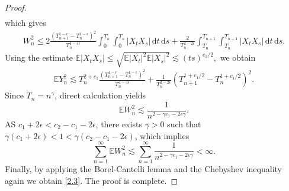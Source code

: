 \documentclass[10pt,a4paper]{amsart}
\begin{document}
\begin{proof}
\begin{align*}
	\end{align*} which gives \begin{align*}
		W_n^2 \le 2 \frac{(T_{n+1}^{1-\epsilon}-T_n^{1-\epsilon})^2}{T_n^{4-4\epsilon}} \int_0^{T_n}\int_0^{T_n} |X_t X_s|\,\mathrm{d}t\,\mathrm{d}s + \frac{2}{T_n^{2-2\epsilon}}\int_{T_n}^{T_{n+1}}\int_{T_n}^{T_{n+1}}|X_tX_s|\,\mathrm{d}t\,\mathrm{d}s.
	\end{align*}
	Using the estimate $
	\mathbb{E} |X_t X_s| \le \sqrt{\mathbb{E} |X_t|^2 \mathbb{E}|X_s|^2} \lesssim   (ts)^{c_1/2},
	$ we obtain \begin{align*}
		\mathbb{E} Y_n^2 \lesssim  T_n^{2+c_1}\frac{(T_{n+1}^{1-\epsilon}-T_n^{1-\epsilon})^2}{T_n^{4-4\epsilon}} + \frac{1 }{T_n^{2-2\epsilon}} (T_{n+1}^{1+c_1/2}-T_n^{1+c_1/2})^2.
	\end{align*} Since $T_n=n^\gamma$, direct calculation yields \[ \mathbb{E} W_n^2  \lesssim \frac{1}{n^{2-\gamma c_1-2\epsilon\gamma}}.\] AS $c_1+2 \epsilon < c_2-c_1-2\epsilon$, there exists $\gamma>0$ such that $\gamma(c_1+2 \epsilon)<1<\gamma(c_2-c_1-2\epsilon)$, which implies \[
	\sum_{n=1}^\infty \mathbb{E} W_n^2  \lesssim \sum_{n=1}^\infty \frac{1}{n^{2-\gamma c_1-2\epsilon\gamma}}< \infty.
	\] Finally, by applying the Borel-Cantelli lemma and the Chebyshev inequality again we obtain \eqref{2.3}. The proof is complete.
\end{proof} 
\end{document}

